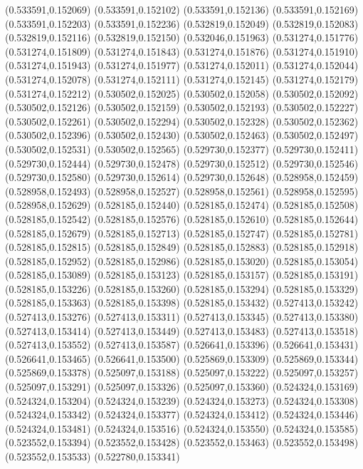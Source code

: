 (0.533591,0.152069)
(0.533591,0.152102)
(0.533591,0.152136)
(0.533591,0.152169)
(0.533591,0.152203)
(0.533591,0.152236)
(0.532819,0.152049)
(0.532819,0.152083)
(0.532819,0.152116)
(0.532819,0.152150)
(0.532046,0.151963)
(0.531274,0.151776)
(0.531274,0.151809)
(0.531274,0.151843)
(0.531274,0.151876)
(0.531274,0.151910)
(0.531274,0.151943)
(0.531274,0.151977)
(0.531274,0.152011)
(0.531274,0.152044)
(0.531274,0.152078)
(0.531274,0.152111)
(0.531274,0.152145)
(0.531274,0.152179)
(0.531274,0.152212)
(0.530502,0.152025)
(0.530502,0.152058)
(0.530502,0.152092)
(0.530502,0.152126)
(0.530502,0.152159)
(0.530502,0.152193)
(0.530502,0.152227)
(0.530502,0.152261)
(0.530502,0.152294)
(0.530502,0.152328)
(0.530502,0.152362)
(0.530502,0.152396)
(0.530502,0.152430)
(0.530502,0.152463)
(0.530502,0.152497)
(0.530502,0.152531)
(0.530502,0.152565)
(0.529730,0.152377)
(0.529730,0.152411)
(0.529730,0.152444)
(0.529730,0.152478)
(0.529730,0.152512)
(0.529730,0.152546)
(0.529730,0.152580)
(0.529730,0.152614)
(0.529730,0.152648)
(0.528958,0.152459)
(0.528958,0.152493)
(0.528958,0.152527)
(0.528958,0.152561)
(0.528958,0.152595)
(0.528958,0.152629)
(0.528185,0.152440)
(0.528185,0.152474)
(0.528185,0.152508)
(0.528185,0.152542)
(0.528185,0.152576)
(0.528185,0.152610)
(0.528185,0.152644)
(0.528185,0.152679)
(0.528185,0.152713)
(0.528185,0.152747)
(0.528185,0.152781)
(0.528185,0.152815)
(0.528185,0.152849)
(0.528185,0.152883)
(0.528185,0.152918)
(0.528185,0.152952)
(0.528185,0.152986)
(0.528185,0.153020)
(0.528185,0.153054)
(0.528185,0.153089)
(0.528185,0.153123)
(0.528185,0.153157)
(0.528185,0.153191)
(0.528185,0.153226)
(0.528185,0.153260)
(0.528185,0.153294)
(0.528185,0.153329)
(0.528185,0.153363)
(0.528185,0.153398)
(0.528185,0.153432)
(0.527413,0.153242)
(0.527413,0.153276)
(0.527413,0.153311)
(0.527413,0.153345)
(0.527413,0.153380)
(0.527413,0.153414)
(0.527413,0.153449)
(0.527413,0.153483)
(0.527413,0.153518)
(0.527413,0.153552)
(0.527413,0.153587)
(0.526641,0.153396)
(0.526641,0.153431)
(0.526641,0.153465)
(0.526641,0.153500)
(0.525869,0.153309)
(0.525869,0.153344)
(0.525869,0.153378)
(0.525097,0.153188)
(0.525097,0.153222)
(0.525097,0.153257)
(0.525097,0.153291)
(0.525097,0.153326)
(0.525097,0.153360)
(0.524324,0.153169)
(0.524324,0.153204)
(0.524324,0.153239)
(0.524324,0.153273)
(0.524324,0.153308)
(0.524324,0.153342)
(0.524324,0.153377)
(0.524324,0.153412)
(0.524324,0.153446)
(0.524324,0.153481)
(0.524324,0.153516)
(0.524324,0.153550)
(0.524324,0.153585)
(0.523552,0.153394)
(0.523552,0.153428)
(0.523552,0.153463)
(0.523552,0.153498)
(0.523552,0.153533)
(0.522780,0.153341)
